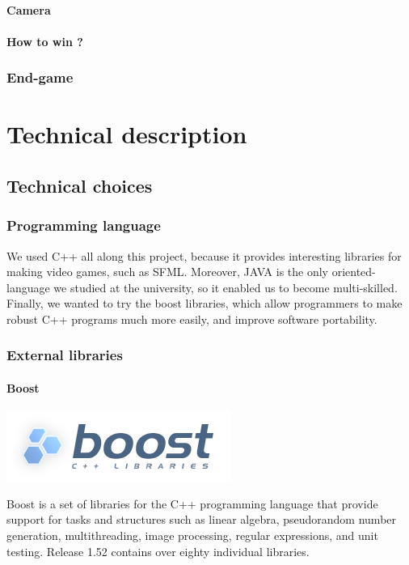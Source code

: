 \documentclass{scrreprt}
\begin{document}
\subsection{Camera}
\subsection{How to win ?}
\section{End-game}

\part{Technical description}
\chapter{Technical choices}
\section{Programming language}
We used C++ all along this project, because it provides interesting libraries for making video games, such as SFML.
Moreover, JAVA is the only oriented-language we studied at the university, so it enabled us to become multi-skilled.
Finally, we wanted to try the boost libraries, which allow programmers to make robust C++ programs much more easily, and improve
software portability.

\section{External libraries}
\subsection{Boost} %
\begin{center}
\includegraphics[scale=0.75]{Boost.png}
\end{center}
Boost is a set of libraries for the C++ programming language that provide support for tasks and structures such as linear algebra, pseudorandom number generation, multithreading, image processing, regular expressions, and unit testing. Release 1.52 contains over eighty individual libraries.\\
\end{document}
